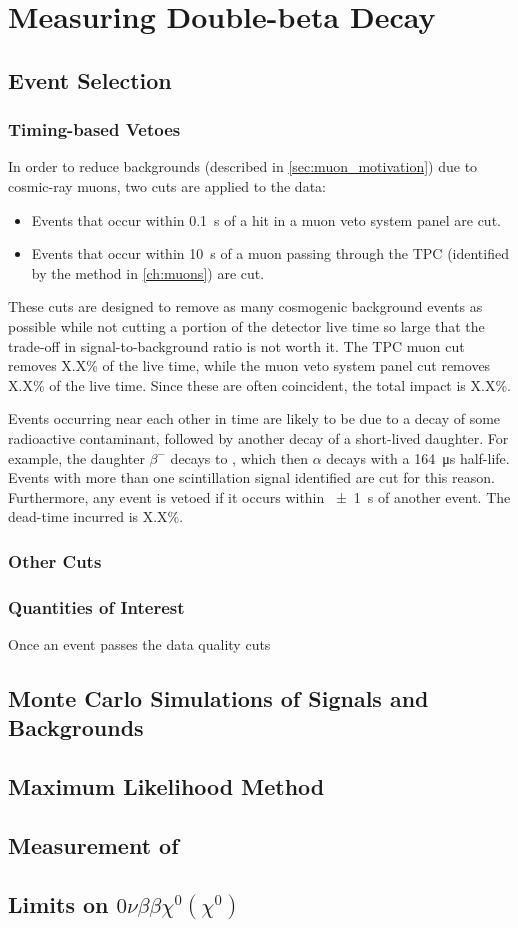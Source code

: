 \documentclass[herrin-thesis.tex]{subfiles}
\begin{document}
\chapter{Measuring Double-beta Decay}
\label{ch:analysis}

\section{Event Selection}
\subsection{Timing-based Vetoes}
In order to reduce backgrounds (described in \cref{sec:muon_motivation}) due to cosmic-ray muons, two cuts are applied to the data:
\begin{itemize}
\item Events that occur within \SI{0.1}{\s} of a hit in a muon veto system panel are cut.
\item Events that occur within \SI{10}{\s} of a muon passing through the TPC (identified by the method in \cref{ch:muons}) are cut.
\end{itemize}
These cuts are designed to remove as many cosmogenic background events as possible while not cutting a portion of the detector live time so large that the trade-off in signal-to-background ratio is not worth it. The TPC muon cut removes X.X\% of the live time, while the muon veto system panel cut removes X.X\% of the live time. Since these are often coincident, the total impact is X.X\%.

Events occurring near each other in time are likely to be due to a decay of some radioactive contaminant, followed by another decay of a short-lived daughter. For example, the  daughter  \(\beta^{-}\) decays to , which then \(\alpha\) decays with a \SI{164}{\micro\s} half-life.  Events with more than one scintillation signal identified are cut for this reason. Furthermore, any event is vetoed if it occurs within \SI{\pm1}{\s} of another event. The dead-time incurred is X.X\%.

\subsection{Other Cuts}

\subsection{Quantities of Interest}
Once an event passes the data quality cuts

\section{Monte Carlo Simulations of Signals and Backgrounds}

\section{Maximum Likelihood Method}

\section{Measurement of \twonu}

\section{Limits on \(0\nu\beta\beta\chi^0(\chi^0)\)}
\end{document}

